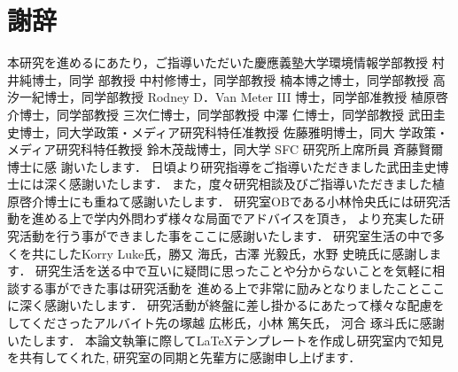 \chapter*{謝辞}
\label{thanks}
本研究を進めるにあたり，ご指導いただいた慶應義塾大学環境情報学部教授 村井純博士，同学
部教授 中村修博士，同学部教授 楠本博之博士，同学部教授 高汐一紀博士，同学部教授 Rodney
D．Van Meter III 博士，同学部准教授 植原啓介博士，同学部教授 三次仁博士，同学部教授 中澤
仁博士，同学部教授 武田圭史博士，同大学政策・メディア研究科特任准教授 佐藤雅明博士，同大
学政策・メディア研究科特任教授 鈴木茂哉博士，同大学 SFC 研究所上席所員 斉藤賢爾博士に感
謝いたします．
日頃より研究指導をご指導いただきました武田圭史博士には深く感謝いたします．
また，度々研究相談及びご指導いただきました植原啓介博士にも重ねて感謝いたします．
研究室OBである小林怜央氏には研究活動を進める上で学内外問わず様々な局面でアドバイスを頂き，
より充実した研究活動を行う事ができました事をここに感謝いたします．
研究室生活の中で多くを共にしたKorry Luke氏，勝又 海氏，古澤 光毅氏，水野 史暁氏に感謝します．
研究生活を送る中で互いに疑問に思ったことや分からないことを気軽に相談する事ができた事は研究活動を
進める上で非常に励みとなりましたことここに深く感謝いたします．
研究活動が終盤に差し掛かるにあたって様々な配慮をしてくださったアルバイト先の塚越 広彬氏，小林 篤矢氏，
河合 琢斗氏に感謝いたします．
本論文執筆に際して\LaTeX テンプレートを作成し研究室内で知見を共有してくれた,
研究室の同期と先輩方に感謝申し上げます．


